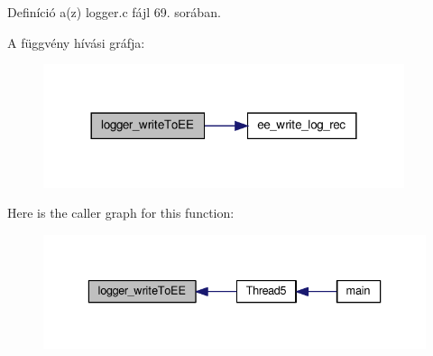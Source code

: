 Definíció a(z) logger.\-c fájl 69. sorában.



A függvény hívási gráfja\-:\nopagebreak
\begin{figure}[H]
\begin{center}
\leavevmode
\includegraphics[width=300pt]{logger_8c_a8f9e5decfda36c73889dcb1ebd212022_cgraph}
\end{center}
\end{figure}




Here is the caller graph for this function\-:
\nopagebreak
\begin{figure}[H]
\begin{center}
\leavevmode
\includegraphics[width=336pt]{logger_8c_a8f9e5decfda36c73889dcb1ebd212022_icgraph}
\end{center}
\end{figure}



